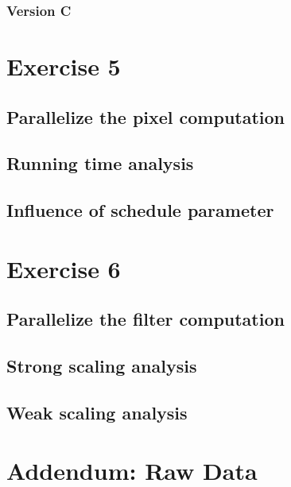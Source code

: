 \documentclass[a4paper,%
7pt,%
DIV12,
headsepline,%
headings=normal,
]{scrartcl}
\begin{document}
\subsubsection{Version C}















\section{Exercise 5}

\subsection{Parallelize the pixel computation}

\subsection{Running time analysis}

\subsection{Influence of schedule parameter}

\section{Exercise 6}

\subsection{Parallelize the filter computation}

\subsection{Strong scaling analysis}

\subsection{Weak scaling analysis}

\newpage

\section{Addendum: Raw Data}
\end{document}
